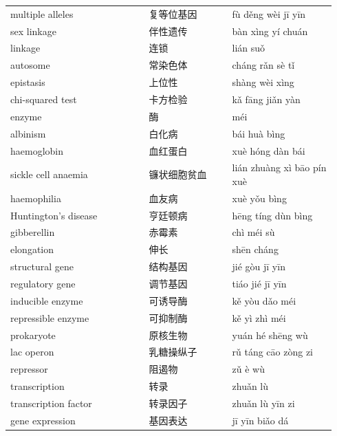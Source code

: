 \documentclass[11pt]{article}
\begin{document}
\begin{longtable}{@{}p{0.40\linewidth}p{0.24\linewidth}p{0.30\linewidth}@{}}
multiple alleles & 复等位基因 & fù děng wèi jī yīn \\
sex linkage & 伴性遗传 & bàn xìng yí chuán \\
linkage & 连锁 & lián suǒ \\
autosome & 常染色体 & cháng rǎn sè tǐ \\
epistasis & 上位性 & shàng wèi xìng \\
chi-squared test & 卡方检验 & kǎ fāng jiǎn yàn \\
enzyme & 酶 & méi \\
albinism & 白化病 & bái huà bìng \\
haemoglobin & 血红蛋白 & xuè hóng dàn bái \\
sickle cell anaemia & 镰状细胞贫血 & lián zhuàng xì bāo pín xuè \\
haemophilia & 血友病 & xuè yǒu bìng \\
Huntington's disease & 亨廷顿病 & hēng tíng dùn bìng \\
gibberellin & 赤霉素 & chì méi sù \\
elongation & 伸长 & shēn cháng \\
structural gene & 结构基因 & jié gòu jī yīn \\
regulatory gene & 调节基因 & tiáo jié jī yīn \\
inducible enzyme & 可诱导酶 & kě yòu dǎo méi \\
repressible enzyme & 可抑制酶 & kě yì zhì méi \\
prokaryote & 原核生物 & yuán hé shēng wù \\
lac operon & 乳糖操纵子 & rǔ táng cāo zòng zi \\
repressor & 阻遏物 & zǔ è wù \\
transcription & 转录 & zhuǎn lù \\
transcription factor & 转录因子 & zhuǎn lù yīn zi \\
gene expression & 基因表达 & jī yīn biǎo dá \\
\end{longtable}
\end{document}
